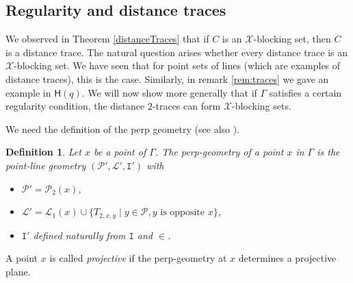 \documentclass[12pt]{article}
\newcommand{\Points}{\mathcal{P}}
\newcommand{\Lines}{\mathcal{L}}
\newcommand{\I}{\mathtt{I}}
\newcommand{\SCHex}{\mathsf{H}}
\newtheorem{definition}{Definition}
\theoremstyle{remark}
\begin{document}
\subsection{Regularity and distance traces}
We observed in Theorem \ref{distanceTraces} that if $C$ is an $\mathcal{X}$-blocking set, then $C$ is a distance trace. The natural question arises whether every distance trace is an $\mathcal{X}$-blocking set. We have seen that for point sets of lines (which are examples of distance traces), this is the case. Similarly, in remark \ref{rem:traces} we gave an example in $\SCHex(q)$. We will now show more generally that if $\Gamma$ satisfies a certain regularity condition, the distance $2$-traces can form $\mathcal{X}$-blocking sets.

We need the definition of the perp geometry (see also \cite[1.9.2]{Hendrik}).

\begin{definition}
	Let \(x\) be a point of \(\Gamma\). The {\em perp-geometry} of a point \(x\) in \(\Gamma\) is the point-line geometry \((\Points',\Lines',\I')\) with
	\begin{itemize}
		\item \(\Points' = \Points_{ 2}(x)\),
		\item \(\Lines' = \Lines_{ 1}(x) \cup \{T_{2,x,y}\mid y\in\Points, y\text{ is opposite } x\}\),
		\item \(\I'\) defined naturally from \(\I\) and \(\in\).
	\end{itemize}
\end{definition}

A point $x$ is called {\em projective} if the perp-geometry at $x$ determines a projective plane. 
\end{document}
